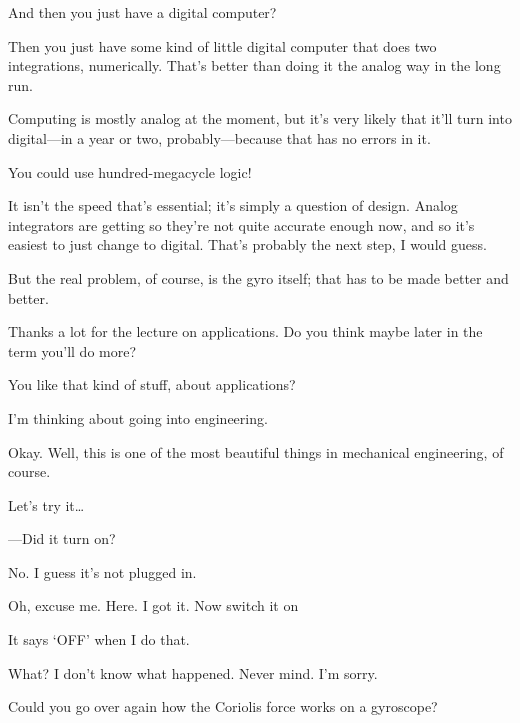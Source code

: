 \documentclass[11pt,oneside]{article}
\begin{document}
And then you just have a digital computer?\par

Then you just have some kind of little digital computer that does two integrations, numerically. That's better than doing it the analog way in the long run.\par

Computing is mostly analog at the moment, but it's very likely that it'll turn into digital---in a year or two, probably---because that has no errors in it.\par

You could use hundred-megacycle logic!\par

It isn't the speed that's essential; it's simply a question of design. Analog integrators are getting so they're not quite accurate enough now, and so it's easiest to just change to digital. That's probably the next step, I would guess.\par

But the real problem, of course, is the gyro itself; that has to be made better and better.\par

Thanks a lot for the lecture on applications. Do you think maybe later in the term you'll do more?\par

You like that kind of stuff, about applications?\par

I'm thinking about going into engineering.\par

Okay. Well, this is one of the most beautiful things in mechanical engineering, of course.\par

Let's try it\ldots{}\par

---Did it turn on?\par

No. I guess it's not plugged in.\par

Oh, excuse me. Here. I got it. Now switch it on\par

It says `OFF' when I do that.\par

What? I don't know what happened. Never mind. I'm sorry.\par

Could you go over again how the Coriolis force works on a gyroscope?\par
\end{document}
